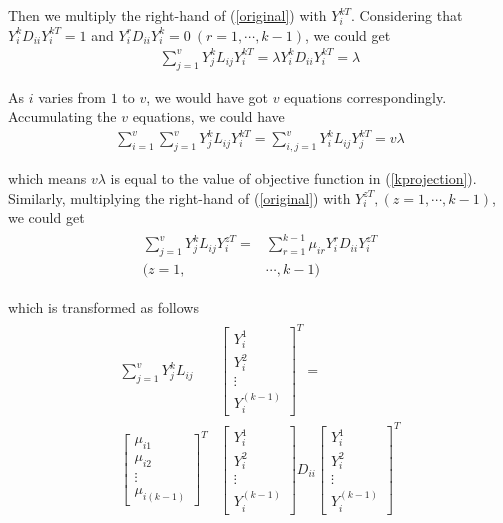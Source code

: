 \documentclass[journal]{IEEEtran}
\begin{document}
Then we multiply the right-hand of (\ref{original}) with $Y_i^{kT}$.
Considering that $Y_i^k{D_{ii}}Y_i^{kT}=1$ and $Y_i^r{D_{ii}}Y_i^k=0\ (r=1,\cdots, k-1)$, we could get 
\begin{gather}
\sum_{j=1}^v Y_j^{k}{L_{ij}}Y_i^{kT}=
\lambda Y_i^k{D_{ii}} Y_i^{kT} = \lambda
\label{lambda}
\end{gather}

As $i$ varies from $1$ to $v$, we would have got $v$ equations correspondingly. 
Accumulating the $v$ equations, we could have
\begin{gather}
\sum_{i=1}^v \sum_{j=1}^v Y_j^{k}{L_{ij}}Y_i^{kT}
=\sum_{i,j=1}^v Y_i^{k}{L_{ij}}Y_j^{kT}=v\lambda 
\end{gather}

which means $v\lambda$ is equal to the value of objective function in (\ref{kprojection}). 
Similarly, multiplying the right-hand of (\ref{original}) with $Y_i^{zT}, (z=1, \cdots, k-1)$, we could get 
\begin{align}
\begin{split}
\sum_{j=1}^v Y_j^{k}{L_{ij}}Y_i^{zT}=&
\sum_{r=1}^{k-1}\mu_{ir}Y_i^r{D_{ii}} Y_i^{zT} \\
(z=1,&\cdots, k-1)
\end{split}
\end{align}

which is transformed as follows 
\begin{align}
\begin{split}
\sum_{j=1}^v Y_j^{k}{L_{ij}} 
&\left[
\begin{array}{c}
Y_i^{1}  \\
Y_i^{2} \\
\vdots \\
Y_i^{(k-1)}
\end{array}
\right]^T= \\
\left[
\begin{array}{c}
\mu_{i1} \\
\mu_{i2} \\
\vdots \\
\mu_{i(k-1)}
\end{array}
\right]^T
&\left[
\begin{array}{c}
Y_i^{1}  \\
Y_i^{2} \\
\vdots \\
Y_i^{(k-1)}
\end{array}
\right]
{D_{ii}}
\left[
\begin{array}{c}
Y_i^{1}  \\
Y_i^{2} \\
\vdots \\
Y_i^{(k-1)}
\end{array}
\right]^T
\label{eq3}
\end{split}
\end{align}
\end{document}
